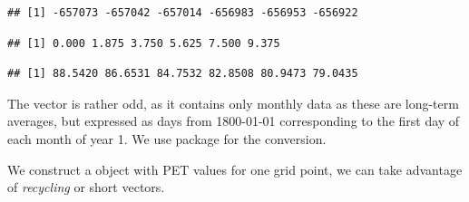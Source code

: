 \documentclass[krantz2]{krantz}\usepackage{knitr}%
\begin{document}
\begin{knitrout}\footnotesize
{}\color{fgcolor}\begin{kframe}
\begin{alltt}
 \hlkwb{<-}  \hlstd{)}
\end{alltt}
\begin{verbatim}
## [1] -657073 -657042 -657014 -656983 -656953 -656922
\end{verbatim}
\begin{alltt}
 \hlkwb{<-}   \hlstd{)}
\end{alltt}
\begin{verbatim}
## [1] 0.000 1.875 3.750 5.625 7.500 9.375
\end{verbatim}
\begin{alltt}
 \hlkwb{<-}  \hlstd{)}
\end{alltt}
\begin{verbatim}
## [1] 88.5420 86.6531 84.7532 82.8508 80.9473 79.0435
\end{verbatim}
\end{kframe}
\end{knitrout}

The  vector is rather odd, as it contains only monthly data as these are long-term averages, but expressed as days from 1800-01-01 corresponding to the first day of each month of year 1. We use package  for the conversion.

We construct a  object with PET values for one grid point, we can take advantage of \emph{recycling} or short vectors.
\end{document}
